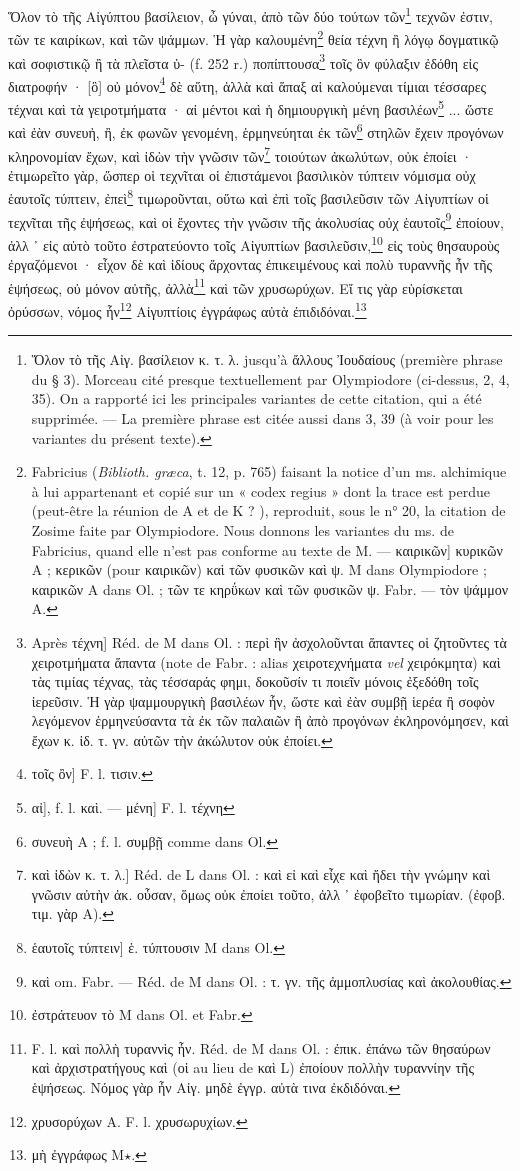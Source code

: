 \documentclass[a4paper, 11pt, oneside, polutonikogreek, french]{article}
\begin{document}
Ὅλον τὸ τῆς Αἰγύπτου βασίλειον, ὦ γύναι, ἀπὸ τῶν δύο τούτων τῶν\footnote{Ὅλον τὸ τῆς Αἰγ. βασίλειον κ. τ. λ. jusqu'à ἄλλους Ἰουδαίους (première phrase du § 3). Morceau cité presque textuellement par Olympiodore (ci-dessus, 2, 4, 35). On a rapporté ici les principales variantes de cette citation, qui a été supprimée. --- La première phrase est citée aussi dans 3, 39 (à voir pour les variantes du présent texte).} τεχνῶν ἐστιν, τῶν τε καιρίκων, καὶ τῶν ψάμμων. Ἡ γὰρ καλουμένη\footnote{Fabricius (\emph{Biblioth. græca}, t. 12, p. 765) faisant la notice d'un ms. alchimique à lui appartenant et copié sur un « codex regius » dont la trace est perdue (peut-être la réunion de A et de K ? ), reproduit, sous le n° 20, la citation de Zosime faite par Olympiodore. Nous donnons les variantes du ms. de Fabricius, quand elle n'est pas conforme au texte de M. --- καιρικῶν] κυρικῶν A ; κερικῶν (pour καιρικῶν) καὶ τῶν φυσικῶν καὶ ψ. M dans Olympiodore ; καιρικῶν A dans Ol. ; τῶν τε κηρΰκων καὶ τῶν φυσικῶν ψ. Fabr. --- τὸν ψάμμον A.} θεία τέχνη ἢ λόγῳ δογματικῷ καὶ σοφιστικῷ ἢ τὰ πλεῖστα ὑ- (f. 252 r.) ποπίπτουσα\footnote{Après τέχνη] Réd. de M dans Ol. : περὶ ἣν ἀσχολοῦνται ἅπαντες οἱ ζητοῦντες τὰ χειροτμήματα ἅπαντα (note de Fabr. : alias χειροτεχνήματα \emph{vel} χειρόκμητα) καὶ τὰς τιμίας τέχνας, τὰς τέσσαράς φημι, δοκοῦσίν τι ποιεῖν μόνοις ἐξεδόθη τοῖς ἱερεῦσιν. Ἡ γὰρ ψαμμουργικὴ βασιλέων ἦν, ὥστε καὶ ἐὰν συμβῇ ἱερέα ἢ σοφὸν λεγόμενον ἑρμηνεύσαντα τὰ ἐκ τῶν παλαιῶν ἢ ἀπὸ προγόνων ἐκληρονόμησεν, καὶ ἔχων κ. ἰδ. τ. γν. αὐτῶν τὴν ἀκώλυτον οὐκ ἐποίει.} τοῖς ὃν φύλαξιν ἐδόθη εἰς διατροφήν · [ὃ] οὐ μόνον\footnote{τοῖς ὂν] F. l. τισιν.} δὲ αὕτη, ἀλλὰ καὶ ἅπαξ αἱ καλούμεναι τίμιαι τέσσαρες τέχναι καὶ τὰ γειροτμήματα · αἰ μέντοι καὶ ἡ δημιουργικὴ μένη βασιλέων\footnote{αἰ], f. l. καὶ. --- μένη] F. l. τέχνη} ... ὥστε καὶ ἐὰν συνευἠ, ἢ, ἐκ φωνῶν γενομένη, ἑρμηνεύηται ἐκ τῶν\footnote{συνευὴ A ; f. l. συμβῇ comme dans Ol.} στηλῶν ἔχειν προγόνων κληρονομίαν ἔχων, καὶ ἰδὼν τὴν γνῶσιν τῶν\footnote{καὶ ἰδὼν κ. τ. λ.] Réd. de L dans Ol. : καὶ εἰ καὶ εἶχε καὶ ἤδει τὴν γνώμην καὶ γνῶσιν αὐτὴν ἀκ. οὖσαν, ὅμως οὐκ ἐποίει τοῦτο, ἀλλ ᾽ ἐφοβεῖτο τιμωρίαν. (ἐφοβ. τιμ. γὰρ A).} τοιούτων ἀκωλύτων, οὐκ ἐποίει · ἐτιμωρεῖτο γὰρ, ὥσπερ οἱ τεχνῖται οἱ ἐπιστάμενοι βασιλικὸν τύπτειν νόμισμα οὐχ ἑαυτοῖς τύπτειν, ἐπεὶ\footnote{ἑαυτοῖς τύπτειν] ἑ. τύπτουσιν M dans Ol.} τιμωροῦνται, οὕτω καὶ ἐπὶ τοῖς βασιλεῦσιν τῶν Αἰγυπτίων οἱ τεχνῖται τῆς ἐψήσεως, καὶ οἱ ἔχοντες τὴν γνῶσιν τῆς ἀκολυσίας οὐχ ἑαυτοῖς\footnote{καὶ om. Fabr. --- Réd. de M dans Ol. : τ. γν. τῆς ἀμμοπλυσίας καὶ ἀκολουθίας.} ἐποίουν, ἀλλ ᾽ εἰς αὐτὸ τοῦτο ἐστρατεύοντο τοῖς Αἰγυπτίων βασιλεῦσιν,\footnote{ἐστράτευον τὸ M dans Ol. et Fabr.} εἰς τοὺς θησαυροὺς ἐργαζόμενοι · εἶχον δὲ καὶ ἰδίους ἄρχοντας ἐπικειμένους καὶ πολὺ τυραννῆς ἦν τῆς ἑψήσεως, οὐ μόνον αὐτῆς, ἀλλὰ\footnote{F. l. καὶ πολλὴ τυραννὶς ἦν. Réd. de M dans Ol. : ἐπικ. ἐπάνω τῶν θησαύρων καὶ ἀρχιστρατήγους καὶ (οἱ au lieu de καὶ L) ἐποίουν πολλὴν τυραννίην τῆς ἑψήσεως. Νόμος γὰρ ἦν Αἰγ. μηδὲ ἐγγρ. αὐτὰ τινα ἐκδιδόναι.} καὶ τῶν χρυσωρύχων. Εἴ τις γὰρ εὑρίσκεται ὀρύσσων, νόμος ἧν\footnote{χρυσορύχων A. F. l. χρυσωρυχίων.} Αἰγυπτίοις ἐγγράφως αὐτὰ ἐπιδιδόναι.\footnote{μὴ ἐγγράφως M$\star$.}
\end{document}
